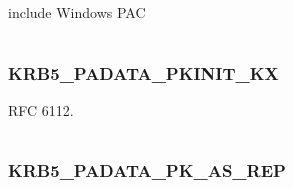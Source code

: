 \documentclass[letterpaper,10pt,english]{sphinxmanual}
\begin{document}
\begin{fulllineitems}
\label{appdev/refs/macros/KRB5_PADATA_PAC_REQUEST:KRB5_PADATA_PAC_REQUEST}
\end{fulllineitems}


include Windows PAC

\begin{tabulary}{\linewidth}{|L|L|}
\hline

 & 
\\
\hline\end{tabulary}



\subsubsection{KRB5\_PADATA\_PKINIT\_KX}
\label{appdev/refs/macros/KRB5_PADATA_PKINIT_KX:krb5-padata-pkinit-kx}\label{appdev/refs/macros/KRB5_PADATA_PKINIT_KX:krb5-padata-pkinit-kx-data}\label{appdev/refs/macros/KRB5_PADATA_PKINIT_KX::doc}

\begin{fulllineitems}
\label{appdev/refs/macros/KRB5_PADATA_PKINIT_KX:KRB5_PADATA_PKINIT_KX}
\end{fulllineitems}


RFC 6112.

\begin{tabulary}{\linewidth}{|L|L|}
\hline

 & 
\\
\hline\end{tabulary}



\subsubsection{KRB5\_PADATA\_PK\_AS\_REP}
\label{appdev/refs/macros/KRB5_PADATA_PK_AS_REP:krb5-padata-pk-as-rep-data}\label{appdev/refs/macros/KRB5_PADATA_PK_AS_REP:krb5-padata-pk-as-rep}\label{appdev/refs/macros/KRB5_PADATA_PK_AS_REP::doc}

\begin{fulllineitems}
\label{appdev/refs/macros/KRB5_PADATA_PK_AS_REP:KRB5_PADATA_PK_AS_REP}
\end{fulllineitems}
\end{document}

